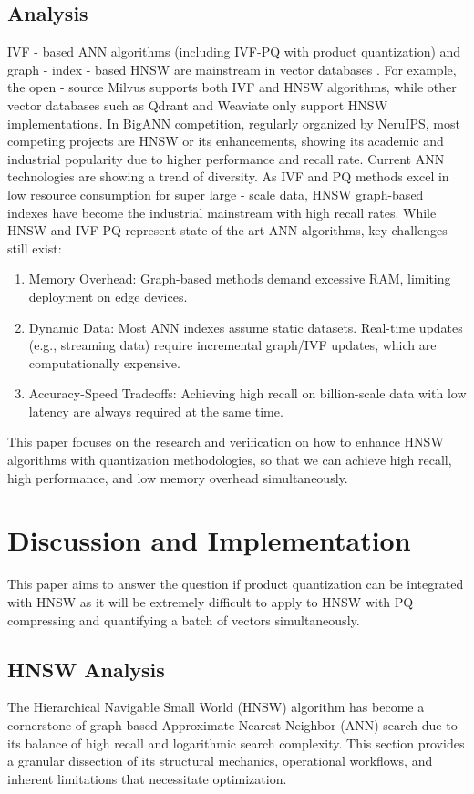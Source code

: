 \documentclass[sigconf, nonacm]{acmart}
\begin{document}
\subsection{Analysis}
IVF - based ANN algorithms (including IVF-PQ with product quantization) and graph - index - based HNSW are mainstream in vector databases \cite{vectordb}. For example, the open - source Milvus \cite{milvus} supports both IVF and HNSW algorithms, while other vector databases such as Qdrant \cite{qdrant} and Weaviate\cite{weaviate} only support HNSW implementations. In BigANN\cite{bigann} competition, regularly organized by NeruIPS, most competing projects are HNSW or its enhancements, showing its academic and industrial popularity due to higher performance and recall rate. 
Current ANN technologies are showing a trend of diversity.  As IVF and PQ methods excel in low resource consumption for super large - scale data, HNSW graph-based indexes have become the industrial mainstream with high recall rates. While HNSW and IVF-PQ represent state-of-the-art ANN algorithms, key challenges still exist:
\begin{enumerate}
    \item Memory Overhead: Graph-based methods demand excessive RAM, limiting deployment on edge devices.
    \item Dynamic Data: Most ANN indexes assume static datasets. Real-time updates (e.g., streaming data) require incremental graph/IVF updates, which are computationally expensive.
    \item Accuracy-Speed Tradeoffs: Achieving high recall on billion-scale data with low latency are always required at the same time.
\end{enumerate}

This paper focuses on the research and verification on how to enhance HNSW algorithms with quantization methodologies, so that we can achieve high recall, high performance, and low memory overhead simultaneously.

\section{Discussion and Implementation}
This paper aims to answer the question if product quantization can be integrated with HNSW as it will be extremely difficult to apply to HNSW with PQ compressing and quantifying a batch of vectors simultaneously.
\subsection{HNSW Analysis}
The Hierarchical Navigable Small World (HNSW) algorithm has become a cornerstone of graph-based Approximate Nearest Neighbor (ANN) search due to its balance of high recall and logarithmic search complexity. This section provides a granular dissection of its structural mechanics, operational workflows, and inherent limitations that necessitate optimization.
\end{document}
